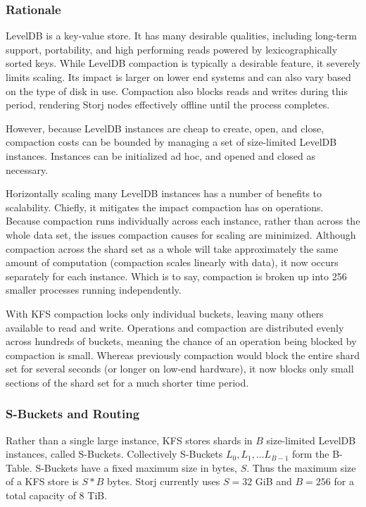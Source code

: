 \documentclass[a4paper,10pt]{article}
\begin{document}
\subsubsection{Rationale}
LevelDB is a key-value store. It has many desirable qualities, including
long-term support, portability, and high performing reads powered by
lexicographically sorted keys. While LevelDB compaction is typically a desirable
feature, it severely limits scaling. Its impact is larger on lower end systems
and can also vary based on the type of disk in use. Compaction also blocks reads
and writes during this period, rendering Storj nodes effectively offline until
the process completes.

However, because LevelDB instances are cheap to create, open, and close,
compaction costs can be bounded by managing a set of size-limited LevelDB
instances. Instances can be initialized ad hoc, and opened and closed as
necessary.

Horizontally scaling many LevelDB instances has a number of benefits to
scalability. Chiefly, it mitigates the impact compaction has on operations.
Because compaction runs individually across each instance, rather than across
the whole data set, the issues compaction causes for scaling are minimized.
Although compaction across the shard set as a whole will take approximately the
same amount of computation (compaction scales linearly with data), it now occurs
separately for each instance. Which is to say, compaction is broken up into 256
smaller processes running independently.

With KFS compaction locks only individual buckets, leaving many others available
to read and write. Operations and compaction are distributed evenly across
hundreds of buckets, meaning the chance of an operation being blocked by
compaction is small. Whereas previously compaction would block the entire shard
set for several seconds (or longer on low-end hardware), it now blocks only
small sections of the shard set for a much shorter time period.

\subsubsection{S-Buckets and Routing}
Rather than a single large instance, KFS stores shards in $ B $ size-limited
LevelDB instances, called S-Buckets. Collectively S-Buckets $ L_{0} , L_{1} , …
L_{B-1} $ form the B-Table. S-Buckets have a fixed maximum size in bytes, $ S $.
Thus the maximum size of a KFS store is $ S * B $ bytes. Storj currently uses $
S = 32 $ GiB and $ B = 256 $ for a total capacity of 8 TiB.
\end{document}
